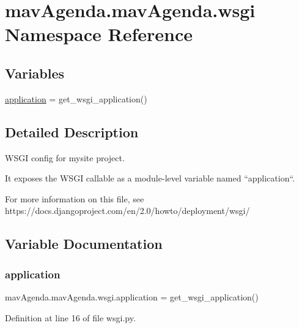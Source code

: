\hypertarget{namespacemavAgenda_1_1mavAgenda_1_1wsgi}{}\section{mav\+Agenda.\+mav\+Agenda.\+wsgi Namespace Reference}
\label{namespacemavAgenda_1_1mavAgenda_1_1wsgi}
\subsection*{Variables}
\begin{DoxyCompactItemize}
\item 
\mbox{\hyperlink{namespacemavAgenda_1_1mavAgenda_1_1wsgi_a8df9e9048cc8d3c0368585caa40d8cc4}{application}} = get\+\_\+wsgi\+\_\+application()
\end{DoxyCompactItemize}


\subsection{Detailed Description}
\begin{DoxyVerb}WSGI config for mysite project.

It exposes the WSGI callable as a module-level variable named ``application``.

For more information on this file, see
https://docs.djangoproject.com/en/2.0/howto/deployment/wsgi/
\end{DoxyVerb}
 

\subsection{Variable Documentation}
\mbox{\label{namespacemavAgenda_1_1mavAgenda_1_1wsgi_a8df9e9048cc8d3c0368585caa40d8cc4}} 
\subsubsection{\texorpdfstring{application}{application}}
{\footnotesize\ttfamily mav\+Agenda.\+mav\+Agenda.\+wsgi.\+application = get\+\_\+wsgi\+\_\+application()}



Definition at line 16 of file wsgi.\+py.

